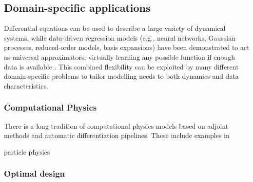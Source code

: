 
\subsection{Domain-specific applications}

Differential equations can be used to describe a large variety of dynamical systems, while data-driven regression models (e.g., neural networks, Gaussian processes, reduced-order models, basis expansions) have been demonstrated to act as universal approximators, virtually learning any possible function if enough data is available \cite{gorban_1998}. 
This combined flexibility can be exploited by many different domain-specific problems to tailor modelling needs to both dynamics and data characteristics.



\subsubsection{Computational Physics}

There is a long tradition of computational physics models based on adjoint methods and automatic differentiation pipelines. 
These include examples in 

particle physics \cite{Dorigo.2022}

\subsubsection{Optimal design}

